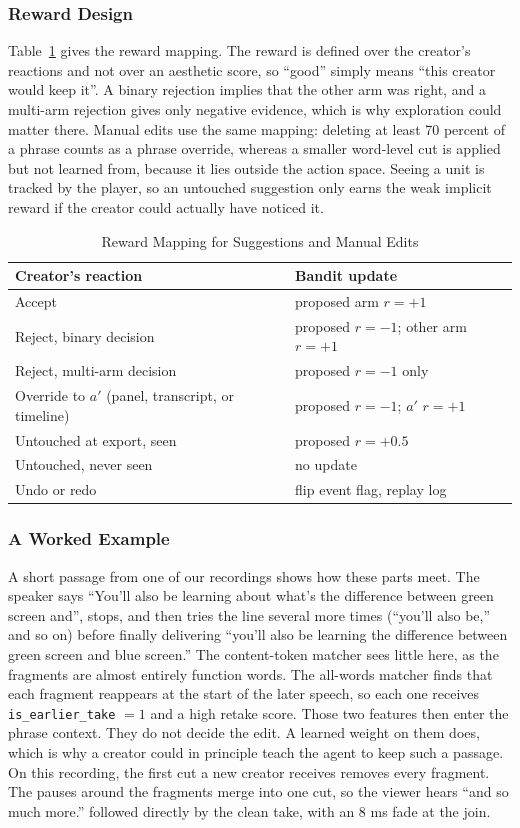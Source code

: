 \documentclass{ieeeaccess}
\begin{document}
\subsubsection{Reward Design}
Table~\ref{tab:reward} gives the reward mapping. The reward is defined over the creator's reactions and not over an aesthetic score, so ``good'' simply means ``this creator would keep it''. A binary rejection implies that the other arm was right, and a multi-arm rejection gives only negative evidence, which is why exploration could matter there. Manual edits use the same mapping: deleting at least 70 percent of a phrase counts as a phrase override, whereas a smaller word-level cut is applied but not learned from, because it lies outside the action space. Seeing a unit is tracked by the player, so an untouched suggestion only earns the weak implicit reward if the creator could actually have noticed it.

\begin{table}[t]
\caption{Reward Mapping for Suggestions and Manual Edits}
\label{tab:reward}
\setlength{\tabcolsep}{3pt}
\centering
\begin{tabular}{|p{42mm}|p{38mm}|}
\hline
Creator's reaction & Bandit update \\
\hline
Accept & proposed arm $r=+1$ \\
Reject, binary decision & proposed $r=-1$; other arm $r=+1$ \\
Reject, multi-arm decision & proposed $r=-1$ only \\
Override to $a'$ (panel, transcript, or timeline) & proposed $r=-1$; $a'$ $r=+1$ \\
Untouched at export, seen & proposed $r=+0.5$ \\
Untouched, never seen & no update \\
Undo or redo & flip event flag, replay log \\
\hline
\end{tabular}
\end{table}

\subsubsection{A Worked Example}
A short passage from one of our recordings shows how these parts meet. The speaker says ``You'll also be learning about what's the difference between green screen and'', stops, and then tries the line several more times (``you'll also be,'' and so on) before finally delivering ``you'll also be learning the difference between green screen and blue screen.'' The content-token matcher sees little here, as the fragments are almost entirely function words. The all-words matcher finds that each fragment reappears at the start of the later speech, so each one receives \texttt{is\_earlier\_take} $=1$ and a high retake score. Those two features then enter the phrase context. They do not decide the edit. A learned weight on them does, which is why a creator could in principle teach the agent to keep such a passage. On this recording, the first cut a new creator receives removes every fragment. The pauses around the fragments merge into one cut, so the viewer hears ``and so much more.'' followed directly by the clean take, with an 8 ms fade at the join.
\end{document}
